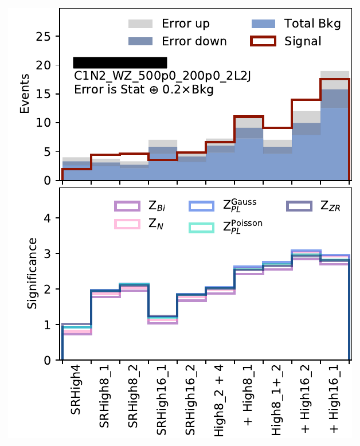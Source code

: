 \begin{figure}[tp]
\centering
\begin{subfigure}{0.48\textwidth}
\centering
\includegraphics[width=\textwidth]{figures/2ljets_disco_High_C1N2_WZ_500p0_200p0_2L2J.png}
\caption{}
\end{subfigure}
\hfill
\begin{subfigure}{0.48\textwidth}
\centering

\end{subfigure}
\end{figure}
